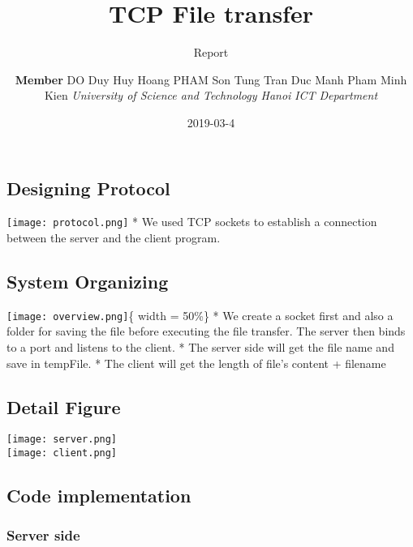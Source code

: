 \documentclass[]{article}
\title{TCP File transfer}
\subtitle{Report}
\author{\textbf{Member} \newline DO Duy Huy Hoang \newline PHAM Son Tung
\newline Tran Duc Manh \newline Pham Minh Kien
\newline \newline \textit{University of Science and Technology Hanoi}
\newline \textit{ICT Department}}
\date{2019-03-4}
\begin{document}
\maketitle

\newpage{}

\tableofcontents
\newpage{}

\subsection{Designing Protocol}\label{designing-protocol}

\texttt{[image: protocol.png]} * We used TCP
sockets to establish a connection between the server and the client
program.

\subsection{System Organizing}\label{system-organizing}

\texttt{[image: overview.png]}\{ width = 50\%\} * We create a socket
first and also a folder for saving the file before executing the file
transfer. The server then binds to a port and listens to the client. *
The server side will get the file name and save in tempFile. * The
client will get the length of file's content + filename

\subsection{Detail Figure}\label{detail-figure}

\texttt{[image: server.png]}\\
\texttt{[image: client.png]}

\subsection{Code implementation}\label{code-implementation}

\subsubsection{Server side}\label{server-side}
\end{document}
